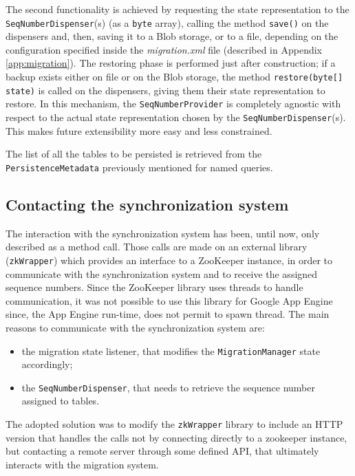 \newparagraph The second functionality is achieved by requesting the state representation to the \texttt{SeqNumberDispenser}(s) (as a \texttt{byte} array), calling the method \texttt{save()} on the dispensers and, then, saving it to a Blob storage, or to a file, depending on the configuration specified inside the \textit{migration.xml} file (described in Appendix \ref{app:migration}). 
\noindent The restoring phase is performed just after construction; if a backup exists either on file or on the Blob storage, the method \texttt{restore(byte[] state)} is called on the dispensers, giving them their state representation to restore.
In this mechanism, the \texttt{SeqNumberProvider} is completely agnostic with respect to the actual state representation chosen by the \texttt{SeqNumberDispenser}(s). This makes future extensibility more easy and less constrained.

\noindent The list of all the tables to be persisted is retrieved from the \texttt{PersistenceMetadata} previously mentioned for named queries.
 
\subsection{Contacting the synchronization system}
The interaction with the synchronization system has been, until now, only described as a method call. Those calls are made on an external library (\texttt{zkWrapper}) which provides an interface to a ZooKeeper instance, in order to communicate with the synchronization system and to receive the assigned sequence numbers.
Since the ZooKeeper library uses threads to handle communication, it was not possible to use this library for Google App Engine since, the App Engine run-time, does not permit to spawn thread.
The main reasons to communicate with the synchronization system are:
\begin{itemize}
\item the migration state listener, that modifies the \texttt{MigrationManager} state accordingly;
\item the \texttt{SeqNumberDispenser}, that needs to retrieve the sequence number assigned to tables.
\end{itemize} 
\noindent The adopted solution was to modify the \texttt{zkWrapper} library to include an HTTP version that handles the calls not by connecting directly to a zookeeper instance, but contacting a remote server through some defined API, that ultimately interacts with the migration system.

